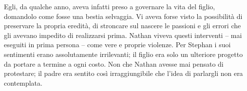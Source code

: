 \documentclass[a4paper,oneside,11pt]{memoir}
\begin{document}
Egli, da qualche anno, aveva infatti preso a governare la vita del figlio,
domandolo come fosse una bestia selvaggia. Vi aveva forse visto la possibilità
di preservare la propria eredità, di stroncare sul nascere le passioni e gli
errori che gli avevano impedito di realizzarsi prima. Nathan viveva questi
interventi -- mai eseguiti in prima persona -- come vere e proprie violenze. Per
Stephan i suoi sentimenti erano assolutamente irrilevanti; il figlio era solo un
ulteriore progetto da portare a termine a ogni costo. Non che Nathan avesse mai
pensato di protestare; il padre era sentito così irraggiungibile che l'idea di
parlargli non era contemplata.
\end{document}
